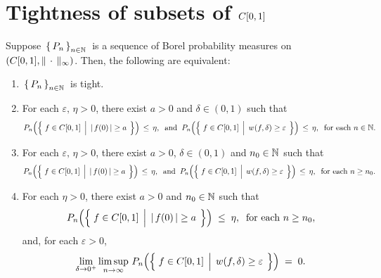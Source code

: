 

\section{Tightness of subsets of $C[0,1]$}
\setcounter{theorem}{0}
\setcounter{equation}{0}

\renewcommand{\theenumi}{\roman{enumi}}
\renewcommand{\labelenumi}{\textnormal{(\theenumi)}$\;\;$}

\begin{theorem}
\label{NecessarySufficientTightnessCzo}
\mbox{}\vskip 0.1cm
\noindent
Suppose \,$\left\{\,P_{n}\,\right\}_{n\in\mathbb{N}}$\, is a sequence of Borel probability measures on
$\left(C[0,1],\Vert\,\cdot\,\Vert_{\infty}\right)$.
\vskip0.1cm
\noindent
Then, the following are equivalent:
\begin{enumerate}
\item	\,$\left\{\,P_{n}\,\right\}_{n\in\mathbb{N}}$\, is tight.
\item	For each $\varepsilon,\,\eta > 0$, there exist $a > 0$ and $\delta \in (0,1)$ such that
		\begin{equation*}
		P_{n}\!\left(\left\{\;
			f \in \Czo
			\;\left\vert\;\,
			\vert\,f(0)\,\vert \overset{{\color{white}.}}{\geq} a
			\right.
		\;\right\}\right)
		\,\leq\, \eta,
		\;\;\textnormal{and}\;\;
		P_{n}\!\left(\left\{\;
			f \in \Czo
			\;\left\vert\;\,
			w(f,\delta) \overset{{\color{white}.}}{\geq} \varepsilon
			\right.
		\;\right\}\right)
		\,\leq\, \eta,
		\;\;
		\textnormal{for each $n \in \N$}.
		\end{equation*}
\item	For each $\varepsilon,\,\eta > 0$, there exist $a > 0$, $\delta \in (0,1)$ and $n_{0} \in \mathbb{N}$ such that
		\begin{equation*}
		P_{n}\!\left(\left\{\;
			f \in \Czo
			\;\left\vert\;\,
			\vert\,f(0)\,\vert \overset{{\color{white}.}}{\geq} a
			\right.
		\;\right\}\right)
		\,\leq\, \eta,
		\;\;\textnormal{and}\;\;
		P_{n}\!\left(\left\{\;
			f \in \Czo
			\;\left\vert\;\,
			w(f,\delta) \overset{{\color{white}.}}{\geq} \varepsilon
			\right.
		\;\right\}\right)
		\,\leq\, \eta,
		\;\;
		\textnormal{for each $n \geq n_{0}$}.
		\end{equation*}
\item	For each $\eta > 0$, there exist $a > 0$ and $n_{0} \in \mathbb{N}$ such that
		\begin{equation*}
		P_{n}\!\left(\left\{\;
			f \in \Czo
			\;\left\vert\;\,
			\vert\,f(0)\,\vert \overset{{\color{white}.}}{\geq} a
			\right.
		\;\right\}\right)
		\;\leq\; \eta,
		\;\;\textnormal{for each $n \geq n_{0}$},
		\end{equation*}
		and, for each $\varepsilon > 0$,
		\begin{equation*}
		\lim_{\delta\rightarrow 0^{+}}
		\limsup_{n\rightarrow\infty}\,
		P_{n}\!\left(\left\{\;
			f \in \Czo
			\;\left\vert\;\,
			w(f,\delta) \overset{{\color{white}.}}{\geq} \varepsilon
			\right.
		\;\right\}\right)
		\;=\; 0.		
		\end{equation*}
\end{enumerate}
\end{theorem}
